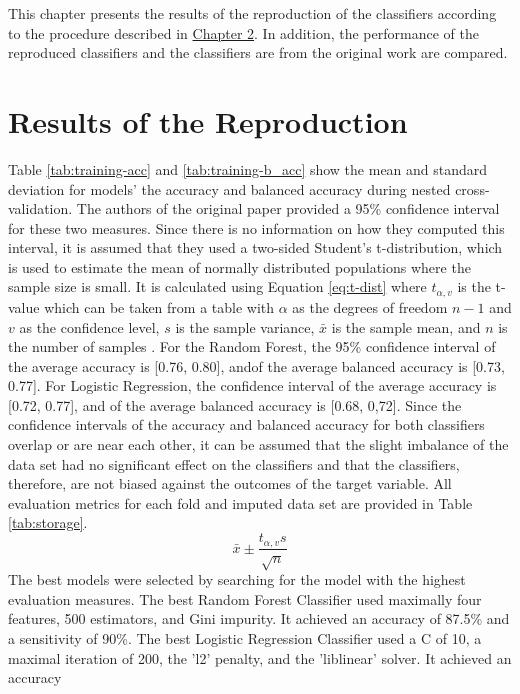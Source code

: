 This chapter presents the results of the reproduction of the classifiers 
according to the procedure described in \hyperref[chap:methods]{Chapter 2}. In 
addition, the performance of the reproduced classifiers and the classifiers are 
from the original work \cite{RN127} are compared. 
\section{Results of the Reproduction}
Table \ref{tab:training-acc} and \ref{tab:training-b_acc} show the mean and 
standard deviation for models' the accuracy and balanced accuracy during 
nested cross-validation. The authors of the original paper provided a 95\% 
confidence interval for these two measures. Since there is no information on 
how they computed this interval, it is assumed that they used a two-sided 
Student's t-distribution, which is used to estimate the mean of normally 
distributed populations where the sample size is small. It is calculated using 
Equation \ref{eq:t-dist} where 
$t_{\alpha, v}$ is the t-value which can be taken from a table with $\alpha$ 
as the degrees of freedom $n-1$ and $v$ as the confidence level, $s$ is the 
sample variance, $\bar{x}$ is the sample mean, and $n$ is the number of samples 
\cite{RN197}.
For the Random Forest, the 95\% confidence interval of the average accuracy is 
[0.76, 0.80], andof the average balanced accuracy is [0.73, 0.77]. 
For Logistic Regression, the confidence interval of the average accuracy is 
[0.72, 0.77], and of the average balanced accuracy is [0.68, 0,72]. Since the 
confidence intervals of the accuracy and balanced accuracy for both classifiers 
overlap or are near each other, it can be assumed that the slight imbalance of 
the data set had no significant effect on the classifiers and that the 
classifiers, therefore, are not biased against the outcomes of the target 
variable. All evaluation metrics for each fold and imputed data set are 
provided in Table \ref{tab:storage}.
\begin{equation}
 \bar{x} \pm \frac{t_{\alpha, v}s}{\sqrt{n}}
 \label{eq:t-dist}
\end{equation}
The best models were selected by searching for the model with the highest 
evaluation measures. The best Random Forest Classifier used 
maximally 
four features, 500 estimators, and Gini impurity. It achieved an accuracy of 
87.5\% and a 
sensitivity of 90\%. The best Logistic Regression Classifier used a C of 10, a 
maximal iteration of 200, the 'l2' penalty, and the 'liblinear' solver. It 
achieved an accuracy 
